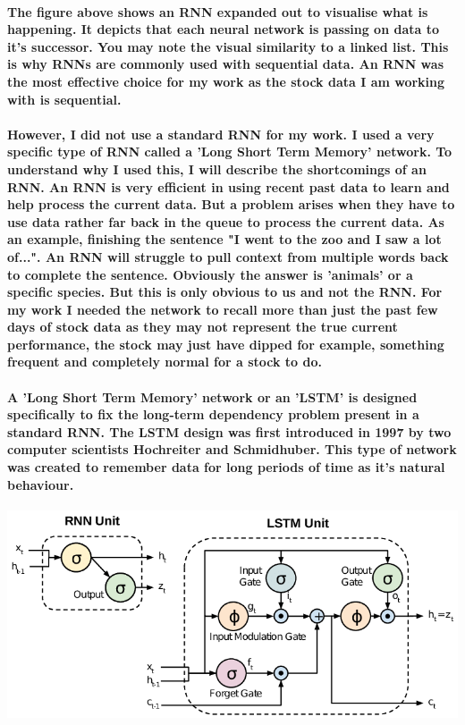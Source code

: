 \paragraph{The figure above shows an RNN expanded out to visualise what is happening. It depicts that each neural network is passing on data to it's successor. You may note the visual similarity to a linked list. This is why RNNs are commonly used with sequential data. An RNN was the most effective choice for my work as the stock data I am working with is sequential.}

\paragraph{However, I did not use a standard RNN for my work. I used a very specific type of RNN called a 'Long Short Term Memory' network. To understand why I used this, I will describe the shortcomings of an RNN. An RNN is very efficient in using recent past data to learn and help process the current data. But a problem arises when they have to use data rather far back in the queue to process the current data. As an example, finishing the sentence "I went to the zoo and I saw a lot of...". An RNN will struggle to pull context from multiple words back to complete the sentence. Obviously the answer is 'animals' or a specific species. But this is only obvious to us and not the RNN. For my work I needed the network to recall more than just the past few days of stock data as they may not represent the true current performance, the stock may just have dipped for example, something frequent and completely normal for a stock to do.}

\paragraph{A 'Long Short Term Memory' network or an 'LSTM' is designed specifically to fix the long-term dependency problem present in a standard RNN. The LSTM design was first introduced in 1997 by two computer scientists Hochreiter and Schmidhuber. This type of network was created to remember data for long periods of time as it's natural behaviour.}


\begin{center}    
    \includegraphics[scale=0.5]{img/RNN-Versus-LSTM.png}
\end{center}

